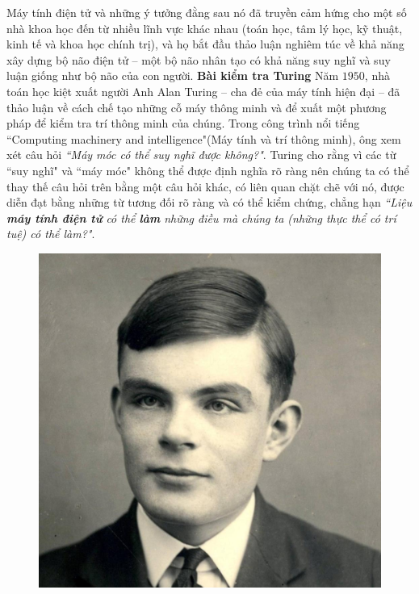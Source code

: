 \begin{multicols}{2}
	\vskip 0.1cm
	Máy tính điện tử và những ý tưởng đằng sau nó đã truyền cảm hứng cho một số nhà khoa học đến từ nhiều lĩnh vực khác nhau (toán học, tâm lý học, kỹ thuật, kinh tế và khoa học chính trị), và họ bắt đầu thảo luận nghiêm túc về khả năng xây dựng  bộ não điện tử -- một bộ não nhân tạo có khả năng suy nghĩ và suy luận giống như bộ não của con người.
	\vskip 0.1cm
	\textbf{\color{cackithi}Bài kiểm tra Turing}
	\vskip 0.1cm
	Năm $1950$, nhà toán học kiệt xuất người Anh Alan Turing -- cha đẻ của máy tính hiện đại -- đã thảo luận về cách chế tạo những cỗ máy thông minh và để xuất một phương pháp để kiểm tra trí thông minh của chúng. Trong công trình nổi tiếng ``Computing machinery and
	intelligence"(Máy tính và trí thông minh), ông xem xét câu hỏi \textit{``Máy móc có thể suy nghĩ được không?"}. Turing cho rằng vì các từ ``suy nghĩ" và ``máy móc" không thể được định nghĩa rõ ràng nên chúng ta có thể thay thế câu hỏi trên bằng một câu hỏi khác, có liên quan chặt chẽ với nó, được diễn đạt bằng những từ tương đối rõ ràng và có thể kiểm chứng, chẳng hạn \textit{``Liệu \textbf{\color{cackithi}máy tính điện tử} có thể \textbf{\color{cackithi}làm} những điều mà chúng ta (những thực thể có trí tuệ) có thể làm?"}.
	\begin{figure}[H]
		\vspace*{-5pt}
		\centering
		\captionsetup{labelformat= empty, justification=centering}
		\includegraphics[width= 1\linewidth]{Alan-Turing.jpg}

\end{figure}
\end{multicols}
